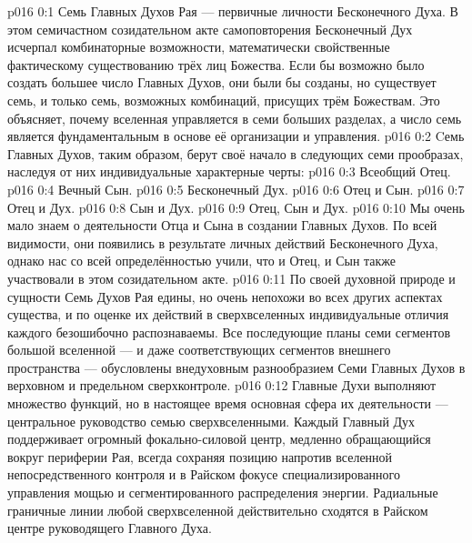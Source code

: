 \author{Всеобщий Цензор}
\vs p016 0:1 Семь Главных Духов Рая --- первичные личности Бесконечного Духа. В этом семичастном созидательном акте самоповторения Бесконечный Дух исчерпал комбинаторные возможности, математически свойственные фактическому существованию трёх лиц Божества. Если бы возможно было создать большее число Главных Духов, они были бы созданы, но существует семь, и только семь, возможных комбинаций, присущих трём Божествам. Это объясняет, почему вселенная управляется в семи больших разделах, а число семь является фундаментальным в основе её организации и управления.
\vs p016 0:2 Cемь Главных Духов, таким образом, берут своё начало в следующих семи прообразах, наследуя от них индивидуальные характерные черты:
\vs p016 0:3 Всеобщий Отец.
\vs p016 0:4 Вечный Сын.
\vs p016 0:5 Бесконечный Дух.
\vs p016 0:6 Отец и Сын.
\vs p016 0:7 Отец и Дух.
\vs p016 0:8 Сын и Дух.
\vs p016 0:9 Отец, Сын и Дух.
\vs p016 0:10 \pc Мы очень мало знаем о деятельности Отца и Сына в создании Главных Духов. По всей видимости, они появились в результате личных действий Бесконечного Духа, однако нас со всей определённостью учили, что и Отец, и Сын также участвовали в этом созидательном акте.
\vs p016 0:11 По своей духовной природе и сущности Семь Духов Рая едины, но очень непохожи во всех других аспектах существа, и по оценке их действий в сверхвселенных индивидуальные отличия каждого безошибочно распознаваемы. Все последующие планы семи сегментов большой вселенной --- и даже соответствующих сегментов внешнего пространства --- обусловлены внедуховным разнообразием Семи Главных Духов в верховном и предельном сверхконтроле.
\vs p016 0:12 Главные Духи выполняют множество функций, но в настоящее время основная сфера их деятельности --- центральное руководство семью сверхвселенными. Каждый Главный Дух поддерживает огромный фокально\hyp{}силовой центр, медленно обращающийся вокруг периферии Рая, всегда сохраняя позицию напротив вселенной непосредственного контроля и в Райском фокусе специализированного управления мощью и сегментированного распределения энергии. Радиальные граничные линии любой сверхвселенной действительно сходятся в Райском центре руководящего Главного Духа.
